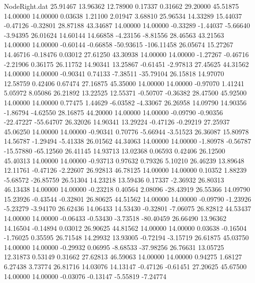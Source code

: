 \begin{filecontents}{NodeRight.dat}
  25.91467   13.96362   12.78900     0.17337    0.31662   29.20000   45.51875   14.00000   14.00000    0.03638    1.21100    2.01947    3.68810
  25.96534   14.33289   15.44037    -0.47126   -0.32801   28.87188   43.34687   14.00000   14.00000   -0.33289   -1.44037   -5.66640   -3.94395
  26.01624   14.60144   14.66858    -4.23156   -8.81556   28.46563   43.21563   14.00000   14.00000   -0.60144   -0.66858  -50.93615 -106.11458
  26.05674   15.27267   14.46716    -0.18476    0.03012   27.61250   43.30938   14.00000   14.00000   -1.27267   -0.46716   -2.21906    0.36175
  26.11752   14.90341   13.25867    -0.61451   -2.97813   27.45625   44.31562   14.00000   14.00000   -0.90341    0.74133   -7.38511  -35.79104
  26.15818   14.97070   12.58759     0.42406    0.67474   27.16875   45.35000   14.00000   14.00000   -0.97070    1.41241    5.05972    8.05086
  26.21892   13.22525   12.55371    -0.50707   -0.36382   28.47500   45.92500   14.00000   14.00000    0.77475    1.44629   -6.03582   -4.33067
  26.26958   14.09790   14.90356    -1.86794   -4.62550   28.16875   44.20000   14.00000   14.00000   -0.09790   -0.90356  -22.47227  -55.64707
  26.32026   14.90341   13.29224    -0.47126   -0.29219   27.25937   45.06250   14.00000   14.00000   -0.90341    0.70776   -5.66944   -3.51523
  26.36087   15.80978   14.56787    -1.29494   -5.41338   26.01562   44.34063   14.00000   14.00000   -1.80978   -0.56787  -15.57880  -65.12560
  26.41145   14.93713   13.02368     0.06593    0.42406   26.12500   45.40313   14.00000   14.00000   -0.93713    0.97632    0.79326    5.10210
  26.46239   13.89648   12.11761    -0.47126   -2.22607   26.92813   46.78125   14.00000   14.00000    0.10352    1.88239   -5.68572  -26.85759
  26.51304   14.23218   13.59436     0.17337   -2.36932   26.80313   46.13438   14.00000   14.00000   -0.23218    0.40564    2.08096  -28.43919
  26.55366   14.09790   15.23926    -0.43544   -0.32801   26.80625   44.51562   14.00000   14.00000   -0.09790   -1.23926   -5.23279   -3.94170
  26.62436   14.06433   14.53430    -0.32801   -7.06075   26.82812   44.53437   14.00000   14.00000   -0.06433   -0.53430   -3.73518  -80.40459
  26.66490   13.96362   14.16504    -0.14894    0.03012   26.90625   44.81562   14.00000   14.00000    0.03638   -0.16504   -1.76025    0.35595
  26.71548   14.29932   13.93005    -0.72194   -3.15719   26.61875   45.03750   14.00000   14.00000   -0.29932    0.06995   -8.68533  -37.98256
  26.76631   13.05725   12.31873     0.53149    0.31662   27.62813   46.59063   14.00000   14.00000    0.94275    1.68127    6.27438    3.73774
  26.81716   14.03076   14.13147    -0.47126   -0.61451   27.20625   45.67500   14.00000   14.00000   -0.03076   -0.13147   -5.55819   -7.24774

\end{filecontents}
